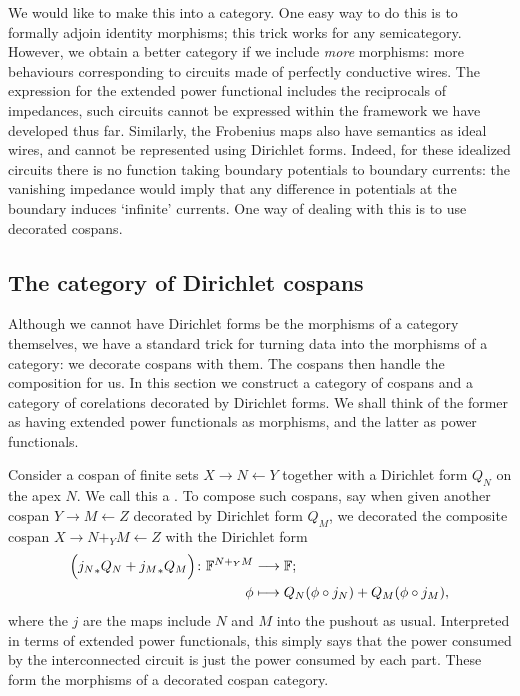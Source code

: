 We would like to make this into a category. One easy way to do this is to
formally adjoin identity morphisms; this trick works for any semicategory.
However, we obtain a better category if we include \emph{more} morphisms: more
behaviours corresponding to circuits made of perfectly conductive wires.
The expression for the extended power functional includes the reciprocals of
impedances, such circuits cannot be expressed within the framework we have
developed thus far. Similarly, the Frobenius maps also have semantics as ideal
wires, and cannot be represented using Dirichlet forms.  Indeed, for these
idealized circuits there is no function taking boundary potentials to boundary
currents: the vanishing impedance would imply that any difference in potentials
at the boundary induces `infinite' currents. One way of dealing with this is to
use decorated cospans.


\subsection{The category of Dirichlet cospans}

Although we cannot have Dirichlet forms be the morphisms of a category
themselves, we have a standard trick for turning data into the morphisms of a
category: we decorate cospans with them. The cospans then handle the composition
for us. In this section we construct a category of cospans and a category of
corelations decorated by Dirichlet forms. We shall think of the former as having
extended power functionals as morphisms, and the latter as power functionals.

Consider a cospan of finite sets $X \to N \leftarrow Y$ together with a
Dirichlet form $Q_N$ on the apex $N$. We call this a .
To compose such cospans, say when given another cospan $Y \to M \leftarrow Z$
decorated by Dirichlet form $Q_M$, we decorated the composite cospan $X \to
N+_YM \leftarrow Z$ with the Dirichlet form
\begin{align*}
  \Big({j_N}_\ast Q_N+ {j_M}_\ast Q_M\Big){\colon} {\mathbb F}^{N+_YM} &\longrightarrow {\mathbb F};\\
  \phi &\longmapsto Q_N(\phi\circ j_N)+Q_M(\phi\circ j_M),
\end{align*}
where the $j$ are the maps include $N$ and $M$ into the pushout as usual.
Interpreted in terms of extended power functionals, this simply says that the
power consumed by the interconnected circuit is just the power consumed by each
part. These form the morphisms of a decorated cospan category.

